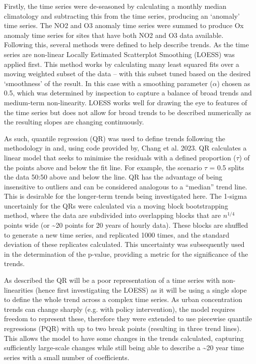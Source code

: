 \documentclass[journal abbreviation, manuscript]{copernicus}
\begin{document}
Firstly, the time series were de-seasoned by calculating a monthly median climatology and subtracting this from the time series, producing an ‘anomaly’ time series. The NO2 and O3 anomaly time series were summed to produce Ox anomaly time series for sites that have both NO2 and O3 data available. Following this, several methods were defined to help describe trends. As the time series are non-linear Locally Estimated Scatterplot Smoothing (LOESS) was applied first. This method works by calculating many least squared fits over a moving weighted subset of the data – with this subset tuned based on the desired ‘smoothness’ of the result. In this case with a smoothing parameter ($\alpha$) chosen as 0.5, which was determined by inspection to capture a balance of broad trends and medium-term non-linearity. LOESS works well for drawing the eye to features of the time series but does not allow for broad trends to be described numerically as the resulting slopes are changing continuously. 

As such, quantile regression (QR) was used to define trends following the methodology in and, using code provided by, Chang et al. 2023. QR calculates a linear model that seeks to minimise the residuals with a defined proportion ($\tau$) of the points above and below the fit line. For example, the scenario $\tau$ = 0.5 splits the data 50:50 above and below the line. QR has the advantage of being insensitive to outliers and can be considered analogous to a “median” trend line. This is desirable for the longer-term trends being investigated here. The 1-sigma uncertainly for the QRs were calculated via a moving block bootstrapping method, where the data are subdivided into overlapping blocks that are $n^{1/4}$ points wide (or \textasciitilde{20} points for 20 years of hourly data). These blocks are shuffled to generate a new time series, and replicated 1000 times, and the standard deviation of these replicates calculated. This uncertainty was subsequently used in the determination of the p-value, providing a metric for the significance of the trends. 

As described the QR will be a poor representation of a time series with non-linearities (hence first investigating the LOESS) as it will be using a single slope to define the whole trend across a complex time series. As urban concentration trends can change sharply (e.g. with policy intervention), the model requires freedom to represent these, therefore they were extended to use piecewise quantile regressions (PQR) with up to two break points (resulting in three trend lines). This allows the model to have some changes in the trends calculated, capturing sufficiently large-scale changes while still being able to describe a \textasciitilde{20} year time series with a small number of coefficients.
\end{document}
